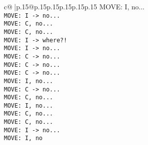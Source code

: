 \documentclass{article}
\begin{document}
{\begin{supertabular}{c@{$\;$}|p{.15\linewidth}@{}p{.15\linewidth}p{.15\linewidth}p{.15\linewidth}p{.15\linewidth}p{.15\linewidth}}
{{{MOVE: I, no...\\ \tt  MOVE: I -> no...\\ \tt  MOVE: C, no...\\ \tt  MOVE: C, no...\\ \tt  MOVE: I -> where?!\\ \tt  MOVE: I -> no...\\ \tt  MOVE: C -> no...\\ \tt  MOVE: C -> no...\\ \tt  MOVE: C -> no...\\ \tt  MOVE: I, no...\\ \tt  MOVE: C -> no...\\ \tt  MOVE: C, no...\\ \tt  MOVE: I, no...\\ \tt  MOVE: C, no...\\ \tt  MOVE: C, no...\\ \tt  MOVE: I -> no...\\ \tt  MOVE: I, no}}}
\end{supertabular}}
\end{document}
